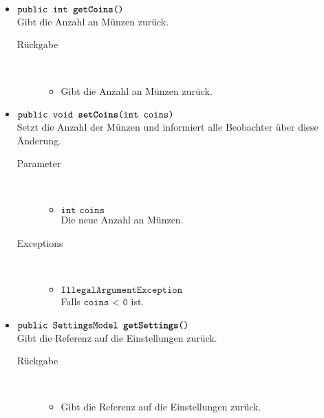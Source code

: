 \begin{description}
\begin{itemize}
		\item $\texttt{public int \textbf{getCoins}()}$ \\ Gibt die Anzahl an Münzen zurück.
		\begin{description}
			\item[Rückgabe] \hfill \\
			\vspace{-.8cm}
			\begin{itemize}
				\item Gibt die Anzahl an Münzen zurück.
			\end{itemize}
		\end{description}
		
		\item $\texttt{public void \textbf{setCoins}(int coins)}$ \\ Setzt die Anzahl der Münzen und informiert alle Beobachter über diese Änderung.
		\begin{description}
			\item[Parameter] \hfill \\
			\vspace{-.8cm}
			\begin{itemize}
				\item $\texttt{int coins}$ \\ Die neue Anzahl an Münzen.	
			\end{itemize}
			\item[Exceptions] \hfill \\
			\vspace{-.8cm}
			\begin{itemize}
				\item $\texttt{IllegalArgumentException}$ \\ Falls $\texttt{coins < 0}$ ist.
			\end{itemize}
		\end{description}
		
		\item $\texttt{public SettingsModel \textbf{getSettings}()}$ \\ Gibt die Referenz auf die Einstellungen zurück.
		\begin{description}
			\item[Rückgabe] \hfill \\
			\vspace{-.8cm}
			\begin{itemize}
				\item Gibt die Referenz auf die Einstellungen zurück.
			\end{itemize}
		\end{description}
		

\end{itemize}
\end{description}
